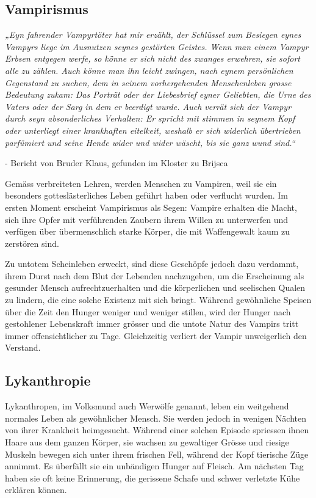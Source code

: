\documentclass[12pt,twoside,twocolumn,openany]{book}
\begin{document}
\subsection{Vampirismus}
\begin{quotebox}
	\textit{„Eyn fahrender Vampyrtöter hat mir erzählt, der Schlüssel zum Besiegen eynes Vampyrs liege im Ausnutzen seynes gestörten Geistes. Wenn man einem Vampyr Erbsen entgegen werfe, so könne er sich nicht des zwanges erwehren, sie sofort alle zu zählen. Auch könne man ihn leicht zwingen, nach eynem  persönlichen Gegenstand zu suchen, dem in seinem vorhergehenden Menschenleben grosse Bedeutung zukam: Das Porträt oder der Liebesbrief eyner Geliebten, die Urne des Vaters oder der Sarg in dem er beerdigt wurde.
		Auch verrät sich der Vampyr durch seyn absonderliches Verhalten: Er spricht mit stimmen in seynem Kopf oder unterliegt einer krankhaften eitelkeit, weshalb er sich widerlich übertrieben parfümiert und seine Hende wider und wider wäscht, bis sie ganz wund sind.“}
	\begin{flushright}
		- Bericht von Bruder Klaus, gefunden im Kloster zu Brijsca
	\end{flushright}
\end{quotebox}
Gemäss verbreiteten Lehren, werden Menschen zu Vampiren, weil sie ein besonders gotteslästerliches Leben geführt haben oder verflucht wurden. Im ersten Moment erscheint Vampirismus als Segen: Vampire erhalten die Macht, sich ihre Opfer mit verführenden Zaubern ihrem Willen zu unterwerfen und verfügen über übermenschlich starke Körper, die mit Waffengewalt kaum zu zerstören sind.

Zu untotem Scheinleben erweckt, sind diese Geschöpfe jedoch dazu verdammt, ihrem Durst nach dem Blut der Lebenden nachzugeben, um die Erscheinung als gesunder Mensch aufrechtzuerhalten und die körperlichen und seelischen Qualen zu lindern, die eine solche Existenz mit sich bringt. Während gewöhnliche Speisen über die Zeit den Hunger weniger und weniger stillen, wird der Hunger nach gestohlener Lebenskraft immer grösser und die untote Natur des Vampirs tritt immer offensichtlicher zu Tage. Gleichzeitig verliert der Vampir unweigerlich den Verstand.


\subsection{Lykanthropie}
Lykanthropen, im Volksmund auch Werwölfe genannt, leben ein weitgehend normales Leben als gewöhnlicher Mensch. Sie werden jedoch in wenigen Nächten von ihrer Krankheit heimgesucht. Während einer solchen Episode spriessen ihnen Haare aus dem ganzen Körper, sie wachsen zu gewaltiger Grösse und riesige Muskeln bewegen sich unter ihrem frischen Fell, während der Kopf tierische Züge annimmt. Es überfällt sie ein unbändigen Hunger auf Fleisch. Am nächsten Tag haben sie oft keine Erinnerung, die gerissene Schafe und schwer verletzte Kühe erklären können.
\end{document}

